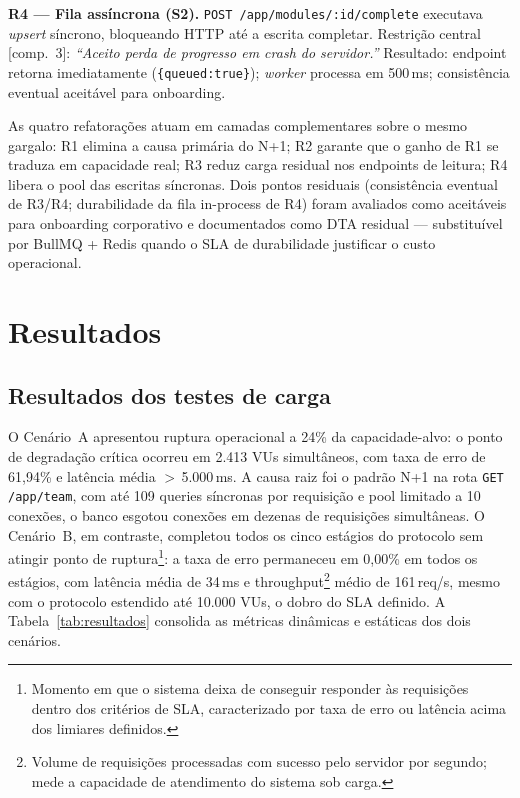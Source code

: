 \documentclass[sigconf]{acmart}
\begin{document}
\textbf{R4 — Fila assíncrona (S2).} \texttt{POST /app/modules/:id/complete}
executava \textit{upsert} síncrono, bloqueando HTTP até a escrita completar.
Restrição central [comp.~3]: \textit{``Aceito perda de progresso em crash do
servidor.''} Resultado: endpoint retorna imediatamente (\texttt{\{queued:true\}});
\textit{worker} processa em 500\,ms; consistência eventual aceitável para onboarding.

As quatro refatorações atuam em camadas complementares sobre o mesmo gargalo:
R1 elimina a causa primária do N+1; R2 garante que o ganho de R1 se traduza em
capacidade real; R3 reduz carga residual nos endpoints de leitura; R4 libera o
pool das escritas síncronas. Dois pontos residuais (consistência eventual de R3/R4;
durabilidade da fila in-process de R4) foram avaliados como aceitáveis para
onboarding corporativo e documentados como DTA residual --- substituível por
BullMQ + Redis quando o SLA de durabilidade justificar o custo operacional.

\section{Resultados}

\subsection{Resultados dos testes de carga}

O Cenário~A apresentou ruptura operacional a 24\% da capacidade-alvo: o ponto de
degradação crítica ocorreu em 2.413 VUs simultâneos, com taxa de erro de 61,94\% e
latência média $>$\,5.000\,ms. A causa raiz foi o padrão N+1 na rota
\texttt{GET /app/team}, com até 109 queries síncronas por requisição e pool
limitado a 10 conexões, o banco esgotou conexões em dezenas de requisições
simultâneas. O Cenário~B, em contraste, completou todos os cinco estágios do
protocolo sem atingir ponto de ruptura\footnote{Momento em que o sistema deixa de
conseguir responder às requisições dentro dos critérios de SLA, caracterizado por
taxa de erro ou latência acima dos limiares definidos.}: a taxa de erro permaneceu em
0,00\% em todos os estágios, com latência média de 34\,ms e
throughput\footnote{Volume de requisições processadas com sucesso pelo servidor por
segundo; mede a capacidade de atendimento do sistema sob carga.} médio de 161\,req/s,
mesmo com o protocolo estendido até 10.000 VUs, o dobro do SLA definido.
A Tabela~\ref{tab:resultados} consolida as métricas dinâmicas e estáticas dos dois
cenários.
\end{document}
